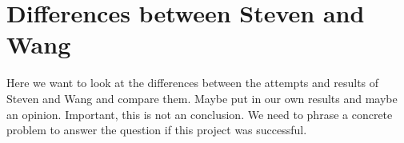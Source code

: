 \chapter{Differences between Steven and Wang}
Here we want to look at the differences between the attempts and results of Steven and Wang and compare them. Maybe put in our own results and maybe an opinion.
Important, this is not an conclusion. We need to phrase a concrete problem to answer the question if this project was successful.  
